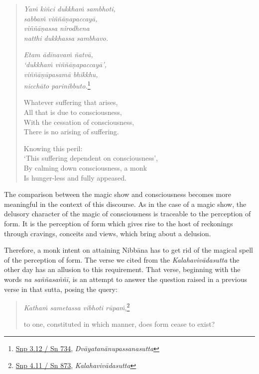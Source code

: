 \begin{quote}
\emph{Yaṁ kiñci dukkhaṁ sambhoti,}\\
\emph{sabbaṁ viññāṇapaccayā,}\\
\emph{viññāṇassa nirodhena}\\
\emph{natthi dukkhassa sambhavo.}

\emph{Etam ādīnavaṁ ñatvā,}\\
\emph{`dukkhaṁ viññāṇapaccayā',}\\
\emph{viññāṇūpasamā bhikkhu,}\\
\emph{nicchāto parinibbuto.}\footnote{\href{https://suttacentral.net/snp3.12/pli/ms}{Snp 3.12 / Sn 734}, \emph{Dvāyatanānupassanasutta}}

Whatever suffering that arises,\\
All that is due to consciousness,\\
With the cessation of consciousness,\\
There is no arising of suffering.

Knowing this peril:\\
`This suffering dependent on consciousness',\\
By calming down consciousness, a monk\\
Is hunger-less and fully appeased.
\end{quote}

The comparison between the magic show and consciousness becomes more meaningful in the context of this discourse. As in the case of a magic show, the delusory character of the magic of consciousness is traceable to the perception of form. It is the perception of form which gives rise to the host of reckonings through cravings, conceits and views, which bring about a delusion.

Therefore, a monk intent on attaining Nibbāna has to get rid of the magical spell of the perception of form. The verse we cited from the \emph{Kalahavivādasutta} the other day has an allusion to this requirement. That verse, beginning with the words \emph{na saññasaññī,} is an attempt to answer the question raised in a previous verse in that sutta, posing the query:

\begin{quote}
\emph{Kathaṁ sametassa vibhoti rūpaṁ},\footnote{\href{https://suttacentral.net/snp4.11/pli/ms}{Snp 4.11 / Sn 873}, \emph{Kalahavivādasutta}}

to one, constituted in which manner, does form cease to exist?
\end{quote}

